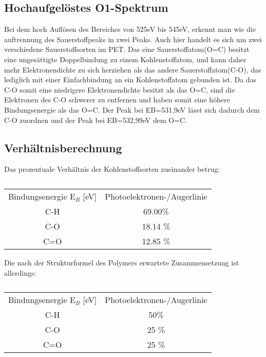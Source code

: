 \documentclass{article}
\begin{document}
\subsection{Hochaufgelöstes O1-Spektrum}

Bei dem hoch Auflösen des Bereiches von 525eV bis 545eV, erkennt man wie die auftrennung des Sauerstoffpeaks in zwei Peaks. Auch hier handelt es sich um zwei verschiedene Sauerstoffsorten im PET. Das eine Sauerstoffatom(O=C) besitzt eine ungesättigte Doppelbindung zu einem Kohlenstoffatom, und kann daher mehr Elektronendichte zu sich herziehen als das andere Sauerstoffatom(C-O), das lediglich mit einer Einfachbindung an ein Kohlenstoffatom gebunden ist. Da das C-O somit eine niedrigere Elektronendichte besitzt als das O=C, sind die Elektronen des C-O schwerer zu entfernen und haben somit eine höhere Bindungsenergie als das O=C. Der Peak bei EB=531,9eV lässt sich dadurch dem C-O zuordnen und der Peak bei EB=532,99eV dem O=C.


\subsection{Verhältnisberechnung}


Das prozentuale Verhältnis der Kohlenstoffsorten zueinander betrug:

\begin{table}[htpb]
  \centering
  \caption{}
  \label{tab:chsc}
  \begin{tabular}{cc}
   Bindungsenergie E$_B$ [eV] & Photoelektronen-/Augerlinie\\
 C-H  & 69.00\% \\
 C-O & 18.14 \% \\
 C=O & 12.85 \% \\



  
  \end{tabular}

\end{table}
  
Die nach der Strukturformel des Polymers erwartete Zusammensetzung ist allerdings:

\begin{table}[htpb]
  \centering
  \caption{}
  \label{tab:chsc}
  \begin{tabular}{cc}
   Bindungsenergie E$_B$ [eV] & Photoelektronen-/Augerlinie\\
 C-H  & 50\% \\
 C-O & 25 \% \\
 C=O & 25 \% \\



  
  \end{tabular}

\end{table}
\end{document}
